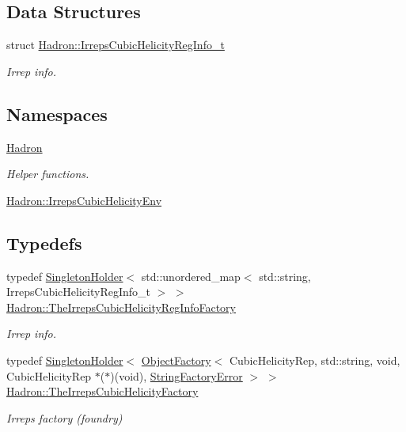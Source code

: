 \subsection*{Data Structures}
\begin{DoxyCompactItemize}
\item 
struct \mbox{\hyperlink{structHadron_1_1IrrepsCubicHelicityRegInfo__t}{Hadron\+::\+Irreps\+Cubic\+Helicity\+Reg\+Info\+\_\+t}}
\begin{DoxyCompactList}\small\item\em Irrep info. \end{DoxyCompactList}\end{DoxyCompactItemize}
\subsection*{Namespaces}
\begin{DoxyCompactItemize}
\item 
 \mbox{\hyperlink{namespaceHadron}{Hadron}}
\begin{DoxyCompactList}\small\item\em Helper functions. \end{DoxyCompactList}\item 
 \mbox{\hyperlink{namespaceHadron_1_1IrrepsCubicHelicityEnv}{Hadron\+::\+Irreps\+Cubic\+Helicity\+Env}}
\end{DoxyCompactItemize}
\subsection*{Typedefs}
\begin{DoxyCompactItemize}
\item 
typedef \mbox{\hyperlink{classUtil_1_1SingletonHolder}{Singleton\+Holder}}$<$ std\+::unordered\+\_\+map$<$ std\+::string, Irreps\+Cubic\+Helicity\+Reg\+Info\+\_\+t $>$ $>$ \mbox{\hyperlink{namespaceHadron_acaa1813cdd4fc3754e8a24a3f0d5267a}{Hadron\+::\+The\+Irreps\+Cubic\+Helicity\+Reg\+Info\+Factory}}
\begin{DoxyCompactList}\small\item\em Irrep info. \end{DoxyCompactList}\item 
typedef \mbox{\hyperlink{classUtil_1_1SingletonHolder}{Singleton\+Holder}}$<$ \mbox{\hyperlink{classUtil_1_1ObjectFactory}{Object\+Factory}}$<$ Cubic\+Helicity\+Rep, std\+::string, void, Cubic\+Helicity\+Rep $\ast$($\ast$)(void), \mbox{\hyperlink{structUtil_1_1StringFactoryError}{String\+Factory\+Error}} $>$ $>$ \mbox{\hyperlink{namespaceHadron_ae17c10048cdbba5312fcaa06692d632a}{Hadron\+::\+The\+Irreps\+Cubic\+Helicity\+Factory}}
\begin{DoxyCompactList}\small\item\em Irreps factory (foundry) \end{DoxyCompactList}\end{DoxyCompactItemize}
